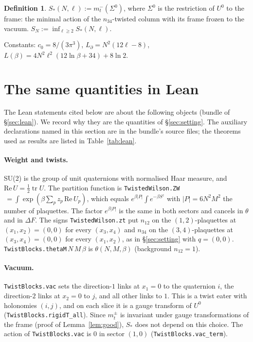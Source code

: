 \documentclass[11pt,a4paper]{article}
\theoremstyle{definition}
\newtheorem{definition}[lemma]{Definition}
\theoremstyle{remark}
\newcommand{\tr}{\operatorname{tr}}
\newcommand{\code}[1]{\texttt{#1}}
\begin{document}
\begin{definition}\label{def:Sstar}
$S_*(N,\ell):=m^-_t(\Sigma^0)$, where $\Sigma^0$ is the restriction of $U^0$ to the frame: the minimal action of the $n_{34}$-twisted column with its frame frozen to the vacuum. $S_N:=\inf_{\ell\ge2}S_*(N,\ell)$.
\end{definition}

Constants: $c_0=8/(3\pi^3)$, $L_\partial=N^2(12\ell-8)$, $L(\beta)=4N^2\ell^2(12\ln\beta+34)+8\ln2$.

\section{The same quantities in Lean}\label{sec:dict}

The Lean statements cited below are about the following objects (bundle of \S\ref{sec:lean}). We record why they are the quantities of \S\ref{sec:setting}. The auxiliary declarations named in this section are in the bundle's source files; the theorems used as results are listed in Table~\ref{tab:lean}.

\paragraph{Weight and twists.}
SU(2) is the group of unit quaternions with normalised Haar measure, and $\mathrm{Re}\,U=\frac12\tr U$.
The partition function is \code{TwistedWilson.ZW}$\,=\int\exp(\beta\sum_pz_p\,\mathrm{Re}\,U_p)$, which equals $e^{\beta|P|}\int e^{-\beta S^z}$ with $|P|=6N^2M^2$ the number of plaquettes.
The factor $e^{\beta|P|}$ is the same in both sectors and cancels in $\theta$ and in $\Delta F$.
The signs \code{TwistedWilson.zt} put $n_{12}$ on the $(1,2)$-plaquettes at $(x_1,x_2)=(0,0)$ for every $(x_3,x_4)$ and $n_{34}$ on the $(3,4)$-plaquettes at $(x_3,x_4)=(0,0)$ for every $(x_1,x_2)$, as in \S\ref{sec:setting} with $q=(0,0)$.
\code{TwistBlocks.thetaM}$\,N\,M\,\beta$ is $\theta(N,M,\beta)$ (background $n_{12}=1$).

\paragraph{Vacuum.}
\code{TwistBlocks.vac} sets the direction-$1$ links at $x_1=0$ to the quaternion $i$, the direction-$2$ links at $x_2=0$ to $j$, and all other links to $1$. This is a twist eater with holonomies $(i,j)$, and on each slice it is a gauge transform of $U^0$ (\code{TwistBlocks.rigidT\_all}). Since $m^\pm_t$ is invariant under gauge transformations of the frame (proof of Lemma~\ref{lem:good}), $S_*$ does not depend on this choice. The action of \code{TwistBlocks.vac} is $0$ in sector $(1,0)$ (\code{TwistBlocks.vac\_term}).
\end{document}
